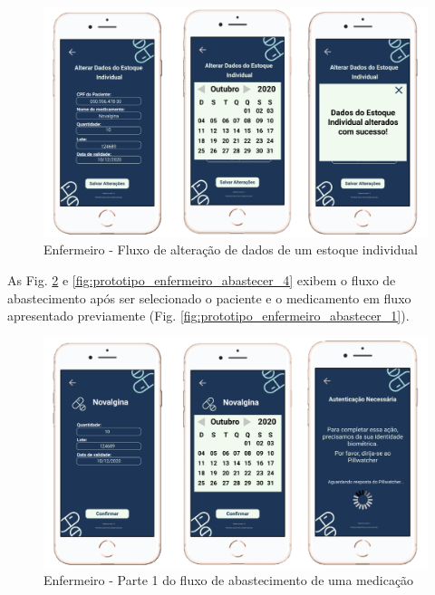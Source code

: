 \begin{figure}[H]
    \centering
    \includegraphics[width=15cm]{figuras/software/Atual_prototipo/Enfermeiro_abastecer_2.png}
    \caption{Enfermeiro - Fluxo de alteração de dados de um estoque individual}
    \label{fig:prototipo_enfermeiro_abastecer_2}
\end{figure}

As Fig. \ref{fig:prototipo_enfermeiro_abastecer_3} e \ref{fig:prototipo_enfermeiro_abastecer_4} exibem o fluxo de abastecimento após ser selecionado o paciente e o medicamento em fluxo apresentado previamente (Fig. \ref{fig:prototipo_enfermeiro_abastecer_1}).

\begin{figure}[H]
    \centering
    \includegraphics[width=15cm]{figuras/software/Atual_prototipo/Enfermeiro_abastecer_3.png}
    \caption{Enfermeiro - Parte 1 do fluxo de abastecimento de uma medicação}
    \label{fig:prototipo_enfermeiro_abastecer_3}
\end{figure}

